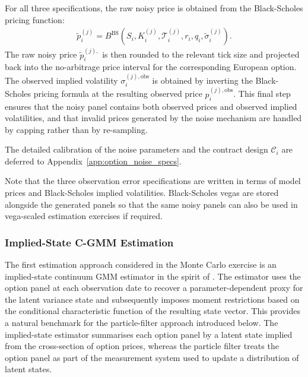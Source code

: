 \documentclass[11pt,a4paper,notitlepage]{article}
\numberwithin{equation}{section}
\begin{document}
For all three specifications, the raw noisy price is obtained from the Black-Scholes pricing function:
\begin{align}
\tilde p_i^{(j)}
=
B^{\mathrm{BS}}
\left(
S_i,K_i^{(j)},\mathcal T_i^{(j)},r_i,q_i,\tilde\sigma_i^{(j)}
\right).
\label{eq:raw_contaminated_price}
\end{align}
The raw noisy price $\tilde p_i^{(j),}$ is then rounded to the relevant tick size and projected back into the no-arbitrage price interval for the corresponding European option. The observed implied volatility $\sigma_i^{(j),\mathrm{obs}}$ is obtained by inverting the Black-Scholes pricing formula at the resulting observed price $p_i^{(j),\mathrm{obs}}$. This final step ensures that the noisy panel contains both observed prices and observed implied volatilities, and that invalid prices generated by the noise mechanism are handled by capping rather than by re-sampling.

The detailed calibration of the noise parameters and the contract design $\mathcal{C}_i$ are deferred to Appendix~\ref{app:option_noise_specs}.

Note that the three observation error specifications are written in terms of model prices and Black-Scholes implied volatilities. Black-Scholes vegas are stored alongside the generated panels so that the same noisy panels can also be used in vega-scaled estimation exercises if required.

\subsubsection{Implied-State C-GMM Estimation}
\label{sec:is_cgmm_estimation}

The first estimation approach considered in the Monte Carlo exercise is an implied-state continuum GMM estimator in the spirit of \citet{boswijk2015asset}. The estimator uses the option panel at each observation date to recover a parameter-dependent proxy for the latent variance state and subsequently imposes moment restrictions based on the conditional characteristic function of the resulting state vector. This provides a natural benchmark for the particle-filter approach introduced below. The implied-state estimator summarises each option panel by a latent state implied from the cross-section of option prices, whereas the particle filter treats the option panel as part of the measurement system used to update a distribution of latent states.
\end{document}
